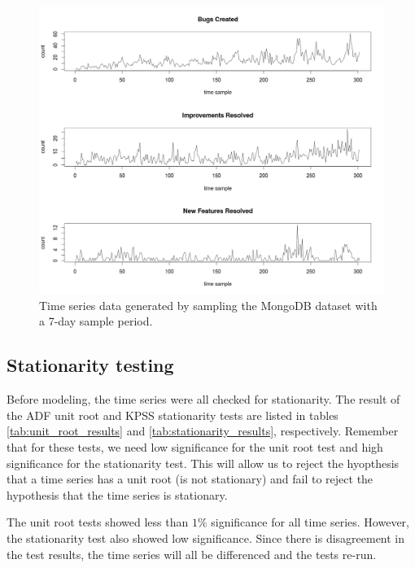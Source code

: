\documentclass[a4paper]{scrartcl}
\begin{document}
\begin{figure}[htbp!]
\begin{center}
\includegraphics[width=\textwidth]{assets/time_series}
\caption{Time series data generated by sampling the MongoDB dataset with a 7-day sample period.}
\label{fig:time_series}
\end{center}
\end{figure}

\subsection*{Stationarity testing}

Before modeling, the time series were all checked for stationarity. The result of the ADF unit root and KPSS stationarity tests are listed in tables \ref{tab:unit_root_results} and \ref{tab:stationarity_results}, respectively. Remember that for these tests, we need low significance for the unit root test and high significance for the stationarity test. This will allow us to reject the hyopthesis that a time series has a unit root (is not stationary) and fail to reject the hypothesis that the time series is stationary. 

The unit root tests showed less than $1\%$ significance for all time series. However, the stationarity test also showed low significance. Since there is disagreement in the test results, the time series will all be differenced and the tests re-run.
\end{document}
